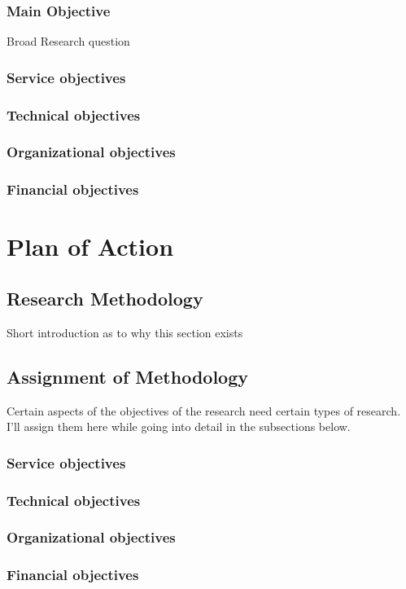 \documentclass[15pt]{article}
\begin{document}
  	\subsubsection{Main Objective}
  	Broad Research question
  	\subsubsection{Service objectives}
    \subsubsection{Technical objectives}
    \subsubsection{Organizational objectives}
    \subsubsection{Financial objectives}

\section{Plan of Action}
  	\subsection{Research Methodology}
  	Short introduction as to why this section exists
  	\subsection{Assignment of Methodology}
    Certain aspects of the objectives of the research need certain types of research. I'll assign them here while going into detail in the subsections below.
	    \subsubsection{Service objectives}
	    \subsubsection{Technical objectives}
	    \subsubsection{Organizational objectives}
	    \subsubsection{Financial objectives}
\end{document}
